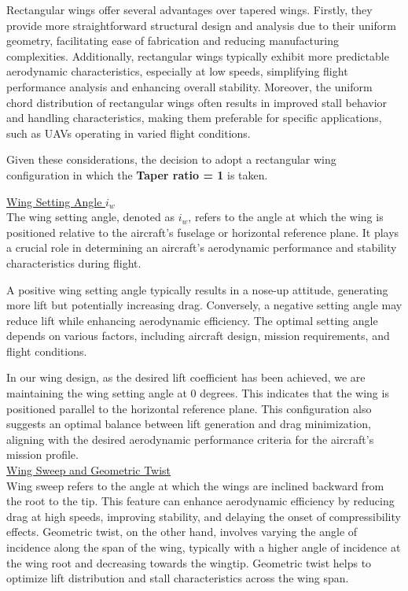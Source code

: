 \documentclass[12 pt]{article}
\begin{document}
Rectangular wings offer several advantages over tapered wings. Firstly, they provide more straightforward structural design and analysis due to their uniform geometry, facilitating ease of fabrication and reducing manufacturing complexities. Additionally, rectangular wings typically exhibit more predictable aerodynamic characteristics, especially at low speeds, simplifying flight performance analysis and enhancing overall stability. Moreover, the uniform chord distribution of rectangular wings often results in improved stall behavior and handling characteristics, making them preferable for specific applications, such as UAVs operating in varied flight conditions.

 Given these considerations, the decision to adopt a rectangular wing configuration in which the\textbf{ Taper ratio = 1 }is taken.\\
 \vspace{5mm}
\color{red}

\large{\underline{Wing Setting Angle $i_w$
}}\\
\color{black}
The wing setting angle, denoted as \( i_w \), refers to the angle at which the wing is positioned relative to the aircraft's fuselage or horizontal reference plane. It plays a crucial role in determining an aircraft's aerodynamic performance and stability characteristics during flight. 

A positive wing setting angle typically results in a nose-up attitude, generating more lift but potentially increasing drag. Conversely, a negative setting angle may reduce lift while enhancing aerodynamic efficiency. The optimal setting angle depends on various factors, including aircraft design, mission requirements, and flight conditions.

In our wing design, as the desired lift coefficient has been achieved,  we are maintaining the wing setting angle at 0 degrees. This indicates that the wing is positioned parallel to the horizontal reference plane. This configuration also suggests an optimal balance between lift generation and drag minimization, aligning with the desired aerodynamic performance criteria for the aircraft's mission profile.\\
\vspace{5mm}
\color{red}
\large{\underline{Wing Sweep and Geometric Twist}}\\
\color{black}
Wing sweep refers to the angle at which the wings are inclined backward from the root to the tip. This feature can enhance aerodynamic efficiency by reducing drag at high speeds, improving stability, and delaying the onset of compressibility effects. Geometric twist, on the other hand, involves varying the angle of incidence along the span of the wing, typically with a higher angle of incidence at the wing root and decreasing towards the wingtip. Geometric twist helps to optimize lift distribution and stall characteristics across the wing span.
\end{document}
